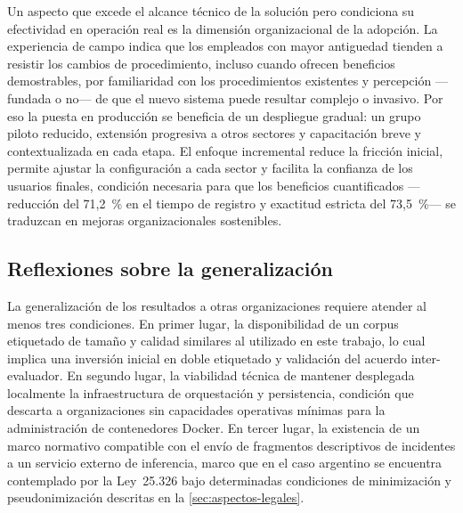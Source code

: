 Un aspecto que excede el alcance técnico de la solución pero condiciona su efectividad en operación real es la dimensión organizacional de la adopción. La experiencia de campo indica que los empleados con mayor antiguedad tienden a resistir los cambios de procedimiento, incluso cuando ofrecen beneficios demostrables, por familiaridad con los procedimientos existentes y percepción ---fundada o no--- de que el nuevo sistema puede resultar complejo o invasivo. Por eso la puesta en producción se beneficia de un despliegue gradual: un grupo piloto reducido, extensión progresiva a otros sectores y capacitación breve y contextualizada en cada etapa. El enfoque incremental reduce la fricción inicial, permite ajustar la configuración a cada sector y facilita la confianza de los usuarios finales, condición necesaria para que los beneficios cuantificados ---reducción del 71,2~\% en el tiempo de registro y exactitud estricta del 73,5~\%--- se traduzcan en mejoras organizacionales sostenibles.

\subsection{Reflexiones sobre la generalización}\label{subsec:reflexiones-generalizacion}

La generalización de los resultados a otras organizaciones requiere atender al menos tres condiciones. En primer lugar, la disponibilidad de un corpus etiquetado de tamaño y calidad similares al utilizado en este trabajo, lo cual implica una inversión inicial en doble etiquetado y validación del acuerdo inter-evaluador. En segundo lugar, la viabilidad técnica de mantener desplegada localmente la infraestructura de orquestación y persistencia, condición que descarta a organizaciones sin capacidades operativas mínimas para la administración de contenedores Docker. En tercer lugar, la existencia de un marco normativo compatible con el envío de fragmentos descriptivos de incidentes a un servicio externo de inferencia, marco que en el caso argentino se encuentra contemplado por la Ley~25.326 \parencite{Ley25326_2000} bajo determinadas condiciones de minimización y pseudonimización descritas en la \autoref{sec:aspectos-legales}.

\newpage
